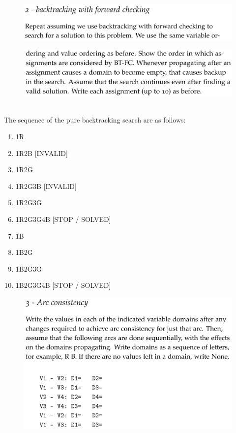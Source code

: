 \documentclass[12pt]{article}
\newenvironment{solution}[2][Solution]{\begin{trivlist}
\item[\hskip \labelsep {\bfseries #1}]}{\end{trivlist}}
\begin{document}
\begin{figure}[h!]
\includegraphics[width=\linewidth]{./assets/201807261943.png}
\end{figure}
\begin{figure}[h!]
\includegraphics[width=\linewidth]{./assets/201807261944.png}
\end{figure}

\begin{solution}{}~\\
The sequence of the pure backtracking search are as follows:\begin{enumerate}
\item 1R
\item 1R2B [INVALID]
\item 1R2G 
\item 1R2G3B [INVALID]
\item 1R2G3G 
\item 1R2G3G4B [STOP / SOLVED]
\item 1B
\item 1B2G
\item 1B2G3G
\item 1B2G3G4B [STOP / SOLVED]
\end{enumerate}
\end{solution}

\begin{figure}[h!]
\includegraphics[width=\linewidth]{./assets/201807261945.png}
\end{figure}
\end{document}
